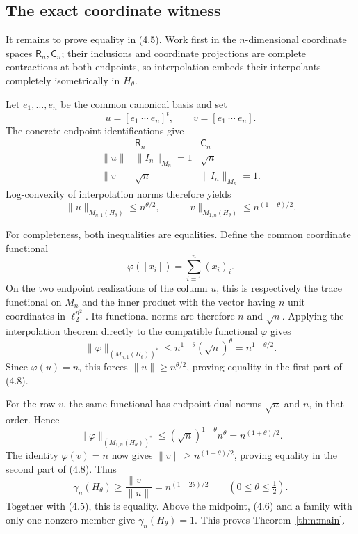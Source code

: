 \documentclass[11pt]{article}
\theoremstyle{definition}
\newcommand{\Rspace}{\mathsf R}
\newcommand{\Cspace}{\mathsf C}
\begin{document}
\subsection*{The exact coordinate witness}

It remains to prove equality in (4.5).  Work first in the \(n\)-dimensional
coordinate spaces \(\Rspace_n,\Cspace_n\); their inclusions and coordinate
projections are complete contractions at both endpoints, so interpolation
embeds their interpolants completely isometrically in \(H_\theta\).

Let \(e_1,\dots,e_n\) be the common canonical basis and set
\[
 u=[e_1\ \cdots\ e_n]^t,
 \qquad v=[e_1\ \cdots\ e_n].
\]
The concrete endpoint identifications give
\[
\begin{array}{c|cc}
 & \Rspace_n & \Cspace_n\\ \hline
 \|u\| & \|I_n\|_{M_n}=1 & \sqrt n\\
 \|v\| & \sqrt n & \|I_n\|_{M_n}=1.
\end{array}\tag{4.7}
\]
Log-convexity of interpolation norms therefore yields
\[
 \|u\|_{M_{n,1}(H_\theta)}\leq n^{\theta/2},
 \qquad
 \|v\|_{M_{1,n}(H_\theta)}\leq n^{(1-\theta)/2}.
\tag{4.8}
\]

For completeness, both inequalities are equalities.  Define the common
coordinate functional
\[
 \varphi([x_i])=\sum_{i=1}^n (x_i)_i.
\]
On the two endpoint realizations of the column \(u\), this is respectively
the trace functional on \(M_n\) and the inner product with the vector having
\(n\) unit coordinates in \(\ell_2^{n^2}\).  Its functional norms are therefore \(n\) and
\(\sqrt n\).  Applying the interpolation theorem directly to the compatible
functional \(\varphi\) gives
\[
 \|\varphi\|_{(M_{n,1}(H_\theta))^*}
 \leq n^{1-\theta}(\sqrt n)^\theta=n^{1-\theta/2}.
\]
Since \(\varphi(u)=n\), this forces
\(\|u\|\geq n^{\theta/2}\), proving equality in the first part of (4.8).

For the row \(v\), the same functional has endpoint dual norms \(\sqrt n\)
and \(n\), in that order.  Hence
\[
 \|\varphi\|_{(M_{1,n}(H_\theta))^*}
 \leq(\sqrt n)^{1-\theta}n^\theta=n^{(1+\theta)/2}.
\]
The identity \(\varphi(v)=n\) now gives
\(\|v\|\geq n^{(1-\theta)/2}\), proving equality in the second part of
(4.8).  Thus
\[
 \gamma_n(H_\theta)\geq\frac{\|v\|}{\|u\|}
 =n^{(1-2\theta)/2} \qquad(0\leq\theta\leq\tfrac12).
\]
Together with (4.5), this is equality.  Above the midpoint, (4.6) and a family
with only one nonzero member give \(\gamma_n(H_\theta)=1\).  This proves
Theorem~\ref{thm:main}.
\end{document}
